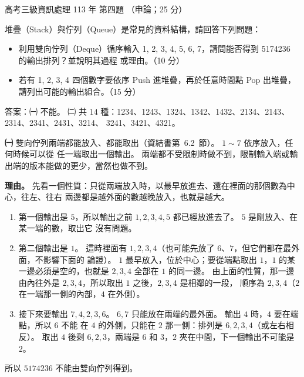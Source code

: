 \begin{pastexam}[label={px:gk3-113-ds-04}]{高考三級資訊處理 113 年 第四題}
（申論；25 分）

堆疊（Stack）與佇列（Queue）是常見的資料結構，請回答下列問題：
\begin{itemize}[leftmargin=2.2em]
\item[㈠] 利用雙向佇列（Deque）循序輸入 1, 2, 3, 4, 5, 6, 7，請問能否得到 5174236 的輸出排列？並說明其過程
或理由。（10 分）
\item[㈡] 若有 1, 2, 3, 4 四個數字要依序 Push 進堆疊，再於任意時間點 Pop 出堆疊，請列出可能的輸出組合。（15 分）
\end{itemize}
\end{pastexam}

\begin{pastsoln}
答案：㈠ 不能。 ㈡ 共 $14$ 種：1234、1243、1324、1342、1432、2134、2143、2314、2341、2431、3214、
3241、3421、4321。

\textbf{㈠} 雙向佇列兩端都能放入、都能取出（資結書第~6.2~節）。 $1 \sim 7$ 依序放入，任何時候可以從
任一端取出一個輸出。 兩端都不受限制時做不到，限制輸入端或輸出端的版本能做的更少，當然也做不到。

\textbf{理由。} 先看一個性質：只從兩端放入時，以最早放進去、還在裡面的那個數為中心，往左、往右
兩邊都是越外面的數越晚放入，也就是越大。

\begin{enumerate}
\item 第一個輸出是 $5$，所以輸出之前 $1, 2, 3, 4, 5$ 都已經放進去了。 $5$ 是剛放入、在某一端的數，取出它
沒有問題。
\item 第二個輸出是 $1$。 這時裡面有 $1, 2, 3, 4$（也可能先放了 $6$、$7$，但它們都在最外面，不影響下面的
論證）。 $1$ 最早放入，位於中心；要從端點取出 $1$，$1$ 的某一邊必須是空的，也就是 $2, 3, 4$ 全部在
$1$ 的同一邊。 由上面的性質，那一邊由內往外是 $2, 3, 4$，所以取出 $1$ 之後，$2, 3, 4$ 是相鄰的一段，
順序為 $2, 3, 4$（$2$ 在一端那一側的內部，$4$ 在外側）。
\item 接下來要輸出 $7, 4, 2, 3, 6$。 $6, 7$ 只能放在兩端的最外面。 輸出 $4$ 時，$4$ 要在端點，所以 $6$ 不能
在 $4$ 的外側，只能在 $2$ 那一側：排列是 $6, 2, 3, 4$（或左右相反）。 取出 $4$ 後剩 $6, 2, 3$，兩端是
$6$ 和 $3$，$2$ 夾在中間，下一個輸出不可能是 $2$。
\end{enumerate}
所以 $5174236$ 不能由雙向佇列得到。


\end{pastsoln}
